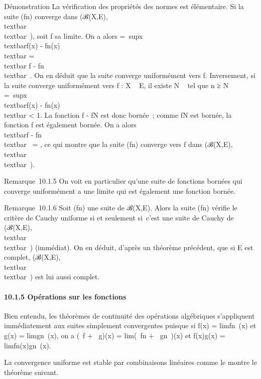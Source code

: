 Démonstration La vérification des propriétés des normes est élémentaire.
Si la suite (fn) converge dans
(ℬ(X,E),\\textbar{} \\textbar{}\infty~), soit f
sa limite. On a alors \mun =\
supx\inX\\textbar{}f(x) -
fn(x)\\textbar{} =\\textbar{} f
- fn\\textbar{}\infty~. On en déduit que la suite
converge uniformément vers f. Inversement, si la suite converge
uniformément vers f : X \rightarrow~ E, il existe N \in {}~ tel que n ≥ N \rigtharrow~
\mun =\
supx\inX\\textbar{}f(x) -
fn(x)\\textbar{} \textless{} 1. La fonction f -
fN est donc bornée~; comme fN est bornée, la
fonction f est également bornée. On a alors \\textbar{}f
- fn\\textbar{}\infty~ = \mun, ce qui montre
que la suite (fn) converge vers f dans
(ℬ(X,E),\\textbar{} \\textbar{}\infty~).

Remarque~10.1.5 On voit en particulier qu'une suite de fonctions bornées
qui converge uniformément a une limite qui est également une fonction
bornée.

Remarque~10.1.6 Soit (fn) une suite de ℬ(X,E). Alors la suite
(fn) vérifie le critère de Cauchy uniforme si et seulement
si~c'est une suite de Cauchy de (ℬ(X,E),\\textbar{}
\\textbar{}\infty~) (immédiat). On en déduit, d'après un
théorème précédent, que si E est complet,
(ℬ(X,E),\\textbar{} \\textbar{}\infty~) est lui
aussi complet.

\paragraph{10.1.5 Opérations sur les fonctions}

Bien entendu, les théorèmes de continuité des opérations algébriques
s'appliquent immédiatement aux suites simplement convergentes puisque si
f(x) = limfn~(x) et g(x)
= limgn~(x), on a (\alpha~f + \beta~g)(x)
= lim(\alpha~fn + \beta~gn~)(x) et
f(x)g(x) = limfn(x)gn~(x).

La convergence uniforme est stable par combinaisons linéaires comme le
montre le théorème suivant.

